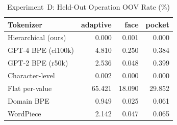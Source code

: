\begin{table}[htbp]
\centering
\caption{Experiment~D: Held-Out Operation OOV Rate (\%)}
\label{tab:exp_d_oov}
\scriptsize
\begin{tabular}{@{}lrrr@{}}
\toprule
\textbf{Tokenizer} & \textbf{adaptive} & \textbf{face} & \textbf{pocket} \\
\midrule
Hierarchical (ours) & 0.000 & 0.001 & 0.000 \\
GPT-4 BPE (cl100k) & 4.810 & 0.250 & 0.384 \\
GPT-2 BPE (r50k) & 2.536 & 0.048 & 0.399 \\
Character-level & 0.002 & 0.000 & 0.000 \\
Flat per-value & 65.421 & 18.090 & 29.852 \\
Domain BPE & 0.949 & 0.025 & 0.061 \\
WordPiece & 2.142 & 0.047 & 0.065 \\
\bottomrule
\end{tabular}
\normalsize
\end{table}
